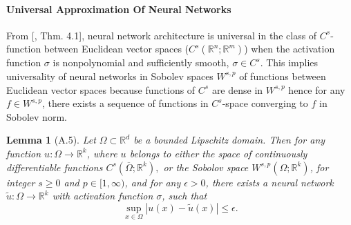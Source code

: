 \documentclass[reqno,9pt]{amsart}
\theoremstyle{plain}
\newtheorem{lem}{Lemma}
\theoremstyle{definition}
\newcommand{\bb}[1]{\mathbb{#1}}
\begin{document}
\paragraph{\bf Universal Approximation Of Neural Networks}
From [\cite{AP1999}, Thm. 4.1], neural network architecture is universal in the class of $C^s$- function between Euclidean vector spaces ($C^s(\bb R^n; \bb R^m)$) when the activation function $\sigma$ is nonpolynomial and sufficiently smooth, $\sigma \in C^s$. This implies universality of neural networks in Sobolev spaces $W^{s,p}$ of functions between Euclidean vector spaces because functions of $C^s$ are dense in $W^{s,p}$ hence for any $f\in W^{s,p}$, there exists a sequence of functions in $C^s$-space converging to $f$ in Sobolev norm.
\begin{lem}[A.5] \label{A.5}
    Let $\Omega \subset \bb R^d$ be a bounded Lipschitz domain. Then for any function $u : \Omega \to \bb R^k$, where $u$ belongs to either the space of continuously differentiable functions $C^s(\overline{\Omega};\bb R^k),$ or the Sobolov space $W^{s,p}(\Omega;\bb R^k)$, for integer $s \geq 0$ and $p \in [1,\infty)$, and for any $\epsilon > 0$, there exists a neural network $\tilde{u} : \Omega \to \bb R^k$ with activation function $\sigma$, such that
    $$ \sup_{x \in \Omega}|u(x) - \tilde{u}(x)| \leq \epsilon.$$
\end{lem}
\end{document}
